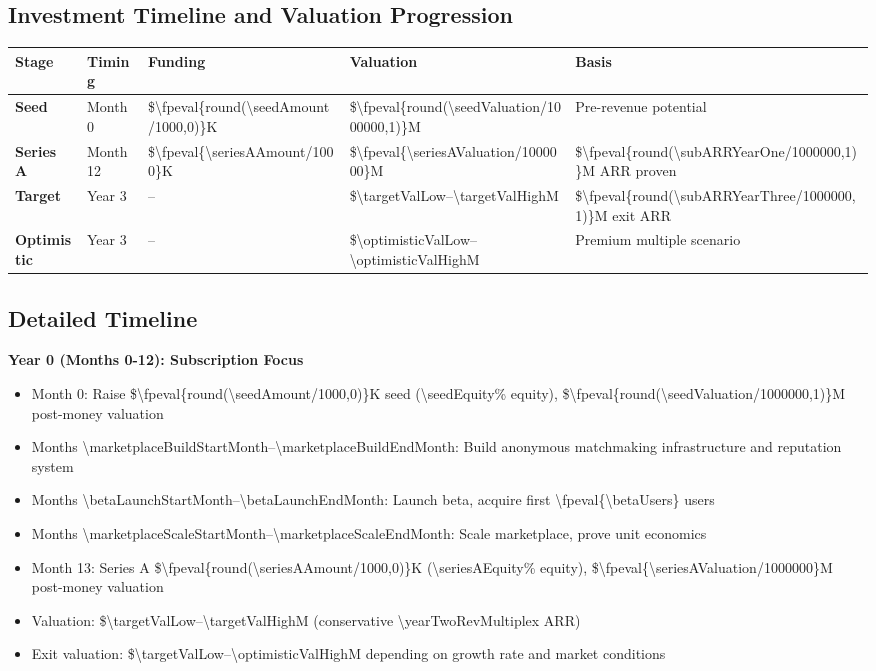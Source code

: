 \documentclass[11pt]{article}
\newcommand{\numfpeval}[1]{\num{\fpeval{#1}}}
\newcommand{\numint}[1]{\num[round-precision=0]{\fpeval{#1}}}
\begin{document}
\subsection{Investment Timeline and Valuation Progression}
\begin{table}[H]
\centering
\begin{tabularx}{\linewidth}{l Y Y Y Y}
\toprule
Stage & Timing & Funding & Valuation & Basis \\\midrule
\textbf{Seed} & Month 0 & \$\numint{round(\seedAmount/1000,0)}K & \$\numfpeval{round(\seedValuation/1000000,1)}M & Pre-revenue potential \\
\textbf{Series A} & Month 12 & \$\numint{\seriesAAmount/1000}K & \$\numfpeval{\seriesAValuation/1000000}M & \$\numfpeval{round(\subARRYearOne/1000000,1)}M ARR proven \\
\textbf{Target} & Year 3 & -- & \$\num{\targetValLow}--\num{\targetValHigh}M & \$\numfpeval{round(\subARRYearThree/1000000,1)}M exit ARR \\
\textbf{Optimistic} & Year 3 & -- & \$\num{\optimisticValLow}--\num{\optimisticValHigh}M & Premium multiple scenario \\
\bottomrule
\end{tabularx}
\end{table}

\subsection{Detailed Timeline}

\textbf{Year 0 (Months 0-12): Subscription Focus}
\begin{itemize}
  \item Month 0: Raise \$\numint{round(\seedAmount/1000,0)}K seed (\num{\seedEquity}\% equity), \$\numfpeval{round(\seedValuation/1000000,1)}M post-money valuation
  \item Months \num{\marketplaceBuildStartMonth}--\num{\marketplaceBuildEndMonth}: Build anonymous matchmaking infrastructure and reputation system
  \item Months \num{\betaLaunchStartMonth}--\num{\betaLaunchEndMonth}: Launch beta, acquire first \numint{\betaUsers} users
  \item Months \num{\marketplaceScaleStartMonth}--\num{\marketplaceScaleEndMonth}: Scale marketplace, prove unit economics
  \item Month 13: Series A \$\numint{round(\seriesAAmount/1000,0)}K (\num{\seriesAEquity}\% equity), \$\numfpeval{\seriesAValuation/1000000}M post-money valuation
  \item Valuation: \$\num{\targetValLow}--\num{\targetValHigh}M (conservative \num{\yearTwoRevMultiple}x ARR)
  \item Exit valuation: \$\num{\targetValLow}--\num{\optimisticValHigh}M depending on growth rate and market conditions
\end{itemize}
\end{document}
